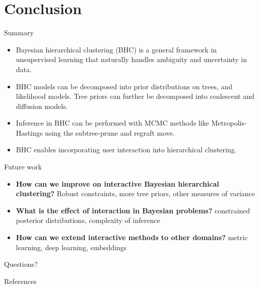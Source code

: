 \documentclass[10pt, compress]{beamer}
\begin{document}
\section{Conclusion}

\begin{frame}{Summary}
  \begin{itemize}
    \item<1-> Bayesian hierarchical clustering (BHC) is a general framework
      in unsupervised learning that naturally handles
      ambiguity and uncertainty in data.
    \item<2-> BHC models can be decomposed into prior distributions
      on trees, and likelihood models. Tree priors
      can further be decomposed into
      coalescent and diffusion models.
    \item<3-> Inference in BHC can be performed
      with MCMC methods like Metropolis-Hastings
      using the subtree-prune and regraft move.
    \item<4-> BHC enables
      incorporating user interaction
      into hierarchical clustering.
  \end{itemize}
\end{frame}

\begin{frame}{Future work}
  \begin{itemize}
    \item<1-> \textbf{How can we improve on interactive Bayesian hierarchical clustering?}
      Robust constraints, more tree priors, other measures of variance
    \item<2-> \textbf{What is the effect of interaction in Bayesian problems?}
      constrained posterior distributions, complexity of inference
    \item<3-> \textbf{How can we extend interactive methods
      to other domains?} metric learning, deep learning,
      embeddings
  \end{itemize}
\end{frame}

\begin{frame}[standout]
Questions?
\end{frame}

\begin{frame}[allowframebreaks]{References}
  
  
\end{frame}
\end{document}
